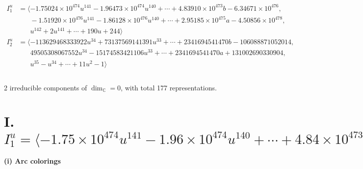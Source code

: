 \documentclass[1p]{elsarticle_modified}
\theoremstyle{definition}
\begin{document}
\begin{align*}
I^u_{1}&=\langle 
-1.75024\times10^{474} u^{141}-1.96473\times10^{474} u^{140}+\cdots+4.83910\times10^{473} b-6.34671\times10^{476},\\
\phantom{I^u_{1}}&\phantom{= \langle  }-1.51920\times10^{476} u^{141}-1.86128\times10^{476} u^{140}+\cdots+2.95185\times10^{475} a-4.50856\times10^{478},\\
\phantom{I^u_{1}}&\phantom{= \langle  }u^{142}+2 u^{141}+\cdots+190 u+244\rangle \\
I^u_{2}&=\langle 
-113629468333922 u^{34}+73137569141391 u^{33}+\cdots+2341694541470 b-106088871052014,\\
\phantom{I^u_{2}}&\phantom{= \langle  }49505308067552 u^{34}-15174583421106 u^{33}+\cdots+2341694541470 a+131002690330904,\\
\phantom{I^u_{2}}&\phantom{= \langle  }u^{35}- u^{34}+\cdots+11 u^2-1\rangle \\
\\
\end{align*}
\raggedright * 2 irreducible components of $\dim_{\mathbb{C}}=0$, with total 177 representations.\\
\newpage
\renewcommand{\arraystretch}{1}
\centering \section*{I. $I^u_{1}= \langle -1.75\times10^{474} u^{141}-1.96\times10^{474} u^{140}+\cdots+4.84\times10^{473} b-6.35\times10^{476},\;-1.52\times10^{476} u^{141}-1.86\times10^{476} u^{140}+\cdots+2.95\times10^{475} a-4.51\times10^{478},\;u^{142}+2 u^{141}+\cdots+190 u+244 \rangle$}
\flushleft \textbf{(i) Arc colorings}\\
\end{document}
